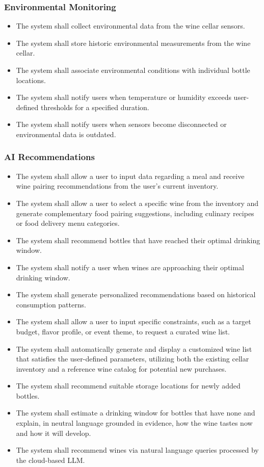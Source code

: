 \documentclass[conference]{IEEEtran}
\begin{document}
\subsubsection{Environmental Monitoring}
\begin{itemize}
    \item The system shall collect environmental data from the wine cellar sensors.
    \item The system shall store historic environmental measurements from the wine cellar.
    \item The system shall associate environmental conditions with individual bottle locations.
    \item The system shall notify users when temperature or humidity exceeds user-defined thresholds for a specified duration.
    \item The system shall notify users when sensors become disconnected or environmental data is outdated.
\end{itemize}

\subsubsection{AI Recommendations}
\begin{itemize}
    \item The system shall allow a user to input data regarding a meal and receive wine pairing recommendations from the user's current inventory.
    \item The system shall allow a user to select a specific wine from the inventory and generate complementary food pairing suggestions, including culinary recipes or food delivery menu categories.
    \item The system shall recommend bottles that have reached their optimal drinking window.
    \item The system shall notify a user when wines are approaching their optimal drinking window.
    \item The system shall generate personalized recommendations based on historical consumption patterns.
    \item The system shall allow a user to input specific constraints, such as a target budget, flavor profile, or event theme, to request a curated wine list.
    \item The system shall automatically generate and display a customized wine list that satisfies the user-defined parameters, utilizing both the existing cellar inventory and a reference wine catalog for potential new purchases.
    \item The system shall recommend suitable storage locations for newly added bottles.
    \item The system shall estimate a drinking window for bottles that have none and explain, in neutral language grounded in evidence, how the wine tastes now and how it will develop.
    \item The system shall recommend wines via natural language queries processed by the cloud-based LLM.
\end{itemize}
\end{document}
